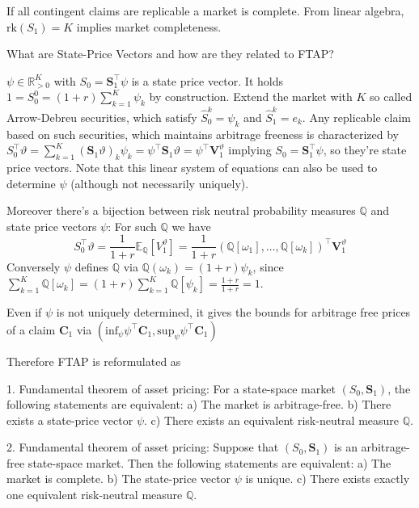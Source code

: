 If all contingent claims are replicable a market is complete. From linear algebra, \( \text{rk}(S_1) = K \) implies market completeness.


What are State-Price Vectors and how are they related to FTAP? 

\( \psi \in \mathbb{R}^{K}_{>0} \) with \( S_0 = \mathbf{S}_1^\top \psi \) is a state price vector.
It holds \( 1 = S^0_0 = (1+r)\sum_{k=1}^K \psi_k \) by construction.
Extend the market with \( K \) so called Arrow-Debreu securities, which satisfy \( \hat{S}_0^k = \psi_k \) and \( \hat{S}_1^k = e_k \).
Any replicable claim based on such securities, which maintains arbitrage freeness is characterized by
\( S_0^\top \vartheta = \sum_{k=1}^K (\mathbf{S}_1 \vartheta)_k \psi_k = \psi^\top \mathbf{S}_1 \vartheta = \psi^\top \mathbf{V}_1^\vartheta \)
implying \( S_0 = \mathbf{S}_1^\top \psi \), so they're state price vectors.
Note that this linear system of equations can also be used to determine \( \psi \) (although not necessarily uniquely).

Moreover there's a bijection between risk neutral probability measures \( \mathbb{Q} \) and state price vectors \( \psi \):
For such \( \mathbb{Q} \) we have
\[ S^\top_0 \vartheta = \frac{1}{1+r}\mathbb{E}_{\mathbb{Q}}[V_1^\vartheta] = \frac{1}{1+r}(\mathbb{Q}[\omega_1], \dots, \mathbb{Q}[\omega_k])^\top \mathbf{V}_1^\vartheta \]
Conversely \( \psi \) defines \( \mathbb{Q} \) via \( \mathbb{Q}(\omega_k) = (1+r) \psi_k \), since
\( \sum_{k=1}^{K} \mathbb{Q}[\omega_k] = (1 + r)\sum_{k=1}^{K} \mathbb{Q}[\psi_k] = \frac{1+r}{1+r} = 1 \).

Even if \( \psi \) is not uniquely determined, it gives the bounds for arbitrage free prices of a claim \( \mathbf{C}_1 \)
via \( (\text{inf}_{\psi} \psi^\top \mathbf{C}_1, \text{sup}_{\psi} \psi^\top \mathbf{C}_1) \)

Therefore FTAP is reformulated as 

1. Fundamental theorem of asset pricing:
For a state-space market \( (S_0, \boldsymbol{S}_1) \), the following statements are equivalent:
a) The market is arbitrage-free.
b) There exists a state-price vector \( \psi \).
c) There exists an equivalent risk-neutral measure \( \mathbb{Q} \).

2. Fundamental theorem of asset pricing:
Suppose that \( (S_0, \boldsymbol{S}_1) \) is an arbitrage-free state-space market. Then the following statements are equivalent:
a) The market is complete.
b) The state-price vector \( \psi \) is unique.
c) There exists exactly one equivalent risk-neutral measure \( \mathbb{Q} \).



